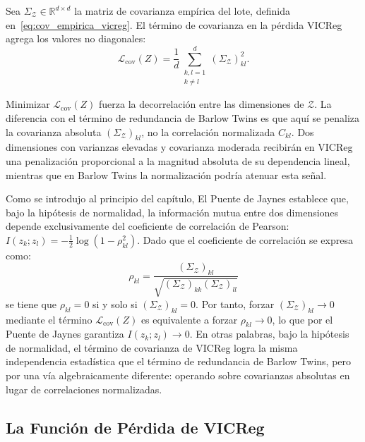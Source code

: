 \begin{definition}
\label{def:vicreg_covarianza}
Sea $\Sigma_\mathcal{Z} \in \mathbb{R}^{d \times d}$ la matriz de covarianza empírica del lote, definida en~\eqref{eq:cov_empirica_vicreg}. El término de covarianza en la pérdida VICReg agrega los valores no diagonales:
\begin{equation}
\label{eq:vicreg_cov}
\mathcal{L}_{\text{cov}}(Z) = \frac{1}{d} \sum_{\substack{k,l=1 \\ k \neq l}}^{d} (\Sigma_\mathcal{Z})_{kl}^2.
\end{equation}
\end{definition}

Minimizar $\mathcal{L}_{\text{cov}}(Z)$ fuerza la decorrelación entre las dimensiones de $\mathcal{Z}$. La diferencia con el término de redundancia de Barlow Twins es que aquí se penaliza la covarianza absoluta $(\Sigma_\mathcal{Z})_{kl}$, no la correlación normalizada $C_{kl}$. Dos dimensiones con varianzas elevadas y covarianza moderada recibirán en VICReg una penalización proporcional a la magnitud absoluta de su dependencia lineal, mientras que en Barlow Twins la normalización podría atenuar esta señal.

\begin{remark}
\label{rem:vicreg_jaynes}
Como se introdujo al principio del capítulo, El Puente de Jaynes establece que, bajo la hipótesis de normalidad, la información mutua entre dos dimensiones depende exclusivamente del coeficiente de correlación de Pearson: $I(z_k; z_l) = -\frac{1}{2}\log(1 - \rho_{kl}^2)$. Dado que el coeficiente de correlación se expresa como:
\begin{equation}
\rho_{kl} = \frac{(\Sigma_\mathcal{Z})_{kl}}{\sqrt{(\Sigma_\mathcal{Z})_{kk}(\Sigma_\mathcal{Z})_{ll}}}
\end{equation}
 se tiene que $\rho_{kl} = 0$ si y solo si $(\Sigma_\mathcal{Z})_{kl} = 0$. Por tanto, forzar $(\Sigma_\mathcal{Z})_{kl} \to 0$ mediante el término $\mathcal{L}_{\text{cov}}(Z)$ es equivalente a forzar $\rho_{kl} \to 0$, lo que por el Puente de Jaynes garantiza $I(z_k; z_l) \to 0$. En otras palabras, bajo la hipótesis de normalidad, el término de covarianza de VICReg logra la misma independencia estadística que el término de redundancia de Barlow Twins, pero por una vía algebraicamente diferente: operando sobre covarianzas absolutas en lugar de correlaciones normalizadas.
\end{remark}

\subsection{La Función de Pérdida de VICReg}


